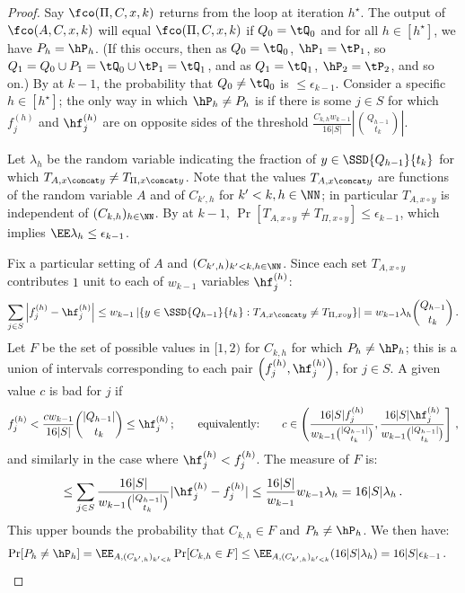 \begin{itemize}
\begin{itemize}
\begin{proof}
  Say $\fco(\Pi, C, x, k)$ returns from the loop at iteration $h^\star$. The output of
  $\fco(A, C, x, k)$ will equal $\fco(\Pi, C, x, k)$ if $Q_0 = \tQ_0$ and for all $h \in [h^\star]$,
  we have $P_h = \hP_h$. (If this occurs, then as $Q_0 = \tQ_0$, $\hP_1 = \tP_1$, so
  $Q_1 = Q_0 \cup P_1 = \tQ_0 \cup \tP_1 = \tQ_1$, and as $Q_1 = \tQ_1$, $\hP_2 = \tP_2$, and so on.)  By  at $k-1$, the probability that
  $Q_0 \ne \tQ_0$ is $\le \epsilon_{k-1}$. Consider a specific $h \in [h^\star]$;
  the only way in which $\hP_h \ne P_h$ is if there is some $j \in S$ for which $f_j^{(h)}$ and $\hf_j^{(h)}$
  are on opposite sides of the threshold $\frac{C_{k,h} w_{k-1}}{16 |S|} |\binom{Q_{h-1}}{t_k}|$.
  
  Let $\lambda_{h}$ be the random variable indicating the fraction of $y \in \SSD{Q_{h-1}}{t_k}$
  for which $T_{A,x \concat y} \ne T_{\Pi,x \concat y}$. Note that the values $T_{A,x \concat y}$ are functions of
  the random variable $A$ and of $C_{k',h}$ for $k' < k, h \in \NN$; in particular $T_{A,x\circ y}$ is independent of $(C_{k,h})_{h \in \NN}$. By  at $k-1$,
  $\Pr[T_{A,x\circ y} \ne T_{\Pi,x\circ y}] \le \epsilon_{k-1}$, which implies $\EE \lambda_h \le \epsilon_{k-1}$.
  
  Fix a particular setting of $A$ and $(C_{k',h})_{k' < k, h \in \NN}$. Since each set $T_{A,x\circ y}$
  contributes $1$ unit to each of $w_{k-1}$ variables $\hf_j^{(h)}$:
  \begin{align*}
    \sum_{j \in S} \left|f_j^{(h)} - \hf_j^{(h)}\right| \le w_{k-1} \left|\left\{y \in \SSD{Q_{h-1}}{t_k} : T_{A,x \concat y} \ne T_{\Pi,x\circ y}\right\}\right| = w_{k-1} \lambda_h \binom{Q_{h-1}}{t_k} \,.
  \end{align*}
  Let $F$ be the set of possible values in $[1,2)$ for $C_{k,h}$ for which $P_h \ne \hP_h$;
  this is a union of intervals corresponding to each pair $\left(f_j^{(h)}, \hf_j^{(h)}\right)$,
  for $j \in S$. A given value $c$ is bad for $j$ if 
  \begin{align*}
    f_j^{(h)} < \frac{c w_{k-1}}{16 |S|} \binom{|Q_{h-1}|}{t_k} \le \hf_j^{(h)} \,; \qquad \text{equivalently:} \qquad c \in \left(\frac{16 |S| f_j^{(h)} }{w_{k-1} \binom{|Q_{h-1}|}{t_k}}, \frac{16 |S| \hf_j^{(h)}}{w_{k-1} \binom{|Q_{h-1}|}{t_k}}\right] \,,
  \end{align*}
  and similarly in the case where $\hf_j^{(h)} < f_j^{(h)}$. The measure of $F$ is:
  \begin{align*}
    \le \sum_{j \in S} \frac{16 |S|}{w_{k-1} \binom{|Q_{h-1}|}{t_k}} |\hf_j^{(h)} - f_j^{(h)}| \le \frac{16 |S|}{w_{k-1}} w_{k-1} \lambda_h = 16 |S| \lambda_h \,.
  \end{align*}
  This upper bounds the probability that $C_{k,h} \in F$ and $P_h \ne \hP_h$. We then have:
  \begin{align*}
    \Pr[P_h \ne \hP_h] &= \EE_{A, (C_{k',h})_{k' < k}} \Pr[ C_{k,h} \in F ] 
      \le \EE_{A, (C_{k',h})_{k' < k}} (16 |S| \lambda_h) = 16 |S| \epsilon_{k-1} \,.
  \end{align*}
  

\end{proof}
\end{itemize}
\end{itemize}
